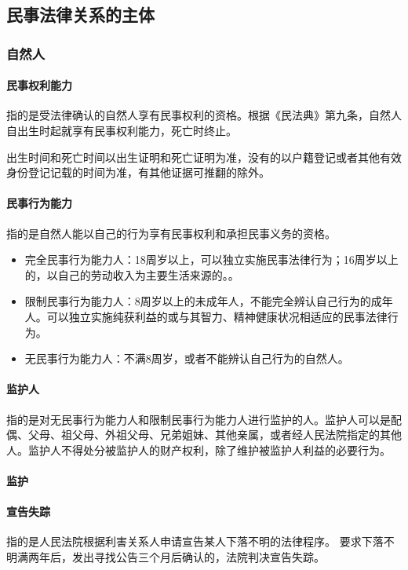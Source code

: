 \subsection{民事法律关系的主体}

\subsubsection{自然人}

\paragraph{民事权利能力} 指的是受法律确认的自然人享有民事权利的资格。根据《民法典》第九条，自然人自出生时起就享有民事权利能力，死亡时终止。

出生时间和死亡时间以出生证明和死亡证明为准，没有的以户籍登记或者其他有效身份登记记载的时间为准，有其他证据可推翻的除外。

\paragraph{民事行为能力} 指的是自然人能以自己的行为享有民事权利和承担民事义务的资格。

\begin{itemize}
	\item 完全民事行为能力人：18周岁以上，可以独立实施民事法律行为；16周岁以上的，以自己的劳动收入为主要生活来源的。。
	\item 限制民事行为能力人：8周岁以上的未成年人，不能完全辨认自己行为的成年人。可以独立实施纯获利益的或与其智力、精神健康状况相适应的民事法律行为。
	\item 无民事行为能力人：不满8周岁，或者不能辨认自己行为的自然人。
\end{itemize}

\paragraph{监护人} 指的是对无民事行为能力人和限制民事行为能力人进行监护的人。监护人可以是配偶、父母、祖父母、外祖父母、兄弟姐妹、其他亲属，或者经人民法院指定的其他人。监护人不得处分被监护人的财产权利，除了维护被监护人利益的必要行为。

\paragraph{监护}

\paragraph{宣告失踪} 指的是人民法院根据利害关系人申请宣告某人下落不明的法律程序。 要求下落不明满两年后，发出寻找公告三个月后确认的，法院判决宣告失踪。

